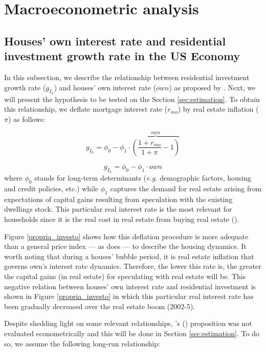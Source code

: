 \section{Macroeconometric analysis}\label{sec:VECM}

\subsection{Houses' own interest rate and residential investment growth rate in the US	Economy}\label{sec:own}

In this subsection, we describe the relationship between residential investment growth rate ($g_{I_h}$) and houses' own interest rate ($own$) as proposed by \textcite{teixeira_crescimento_2015}. 
Next, we will present the hypothesis to be tested on the Section \ref{sec:estimation}. To obtain this relationship, we deflate mortgage interest rate ($r_{mo}$) by real estate inflation ($\pi$) as follows:

$$
g_{I_h} = \phi_0 - \phi_1\cdot \overbrace{\left(\frac{1+r_{mo}}{1+\pi} - 1\right)}^{own}
$$


\begin{equation}
g_{I_h} = \phi_0 - \phi_1\cdot own
\end{equation}
where $\phi_0$ stands for long-term determinants (\textit{e.g.} demographic factors, housing and credit policies, etc.) while $\phi_1$ captures the demand for real estate arising from expectations of capital gains resulting from speculation with the existing dwellings stock. 
This particular real interest rate is the most relevant for households since it is the real cost in real estate from buying real estate  (\cite[p.~53]{teixeira_crescimento_2015}).

Figure \ref{propria_investo} shows how this deflation procedure is more adequate than a general price index --- as \textcite[p.~143--6]{fair_macroeconometric_2013} does --- to describe the housing dynamics. It worth noting that during a houses' bubble period, it is real estate inflation that governs own's interest rate dynamics.
Therefore, the lower this rate is, the greater the capital gains (in real estate) for speculating with real estate will be. This negative relation between houses' own interest rate and residential investment is shown in Figure \ref{propria_investo} in which this particular real interest rate has been gradually decreased over the real estate boom (2002-5).

Despite shedding light on some relevant relationships, \citeauthor{teixeira_crescimento_2015}'s (\citeyear{teixeira_crescimento_2015}) proposition was not evaluated econometrically and this will be done in Section \ref{sec:estimation}. To do so, we assume the following long-run relationship:

